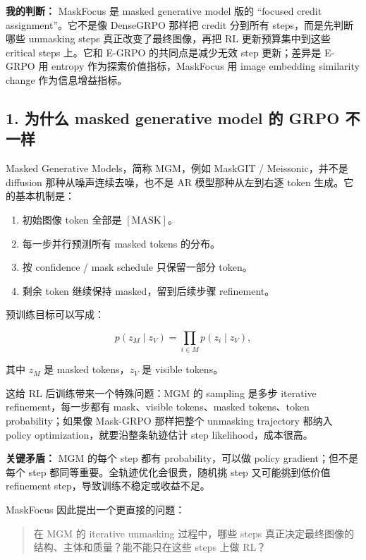 \begin{summarybox}
\textbf{我的判断：} MaskFocus 是 masked generative model 版的 ``focused credit assignment''。它不是像 DenseGRPO 那样把 credit 分到所有 steps，而是先判断哪些 unmasking steps 真正改变了最终图像，再把 RL 更新预算集中到这些 critical steps 上。它和 E-GRPO 的共同点是减少无效 step 更新；差异是 E-GRPO 用 entropy 作为探索价值指标，MaskFocus 用 image embedding similarity change 作为信息增益指标。
\end{summarybox}

\subsection{1. 为什么 masked generative model 的 GRPO 不一样}

Masked Generative Models，简称 MGM，例如 MaskGIT / Meissonic，并不是 diffusion 那种从噪声连续去噪，也不是 AR 模型那种从左到右逐 token 生成。它的基本机制是：

\begin{enumerate}[leftmargin=1.5em]
  \item 初始图像 token 全部是 \([\mathrm{MASK}]\)。
  \item 每一步并行预测所有 masked tokens 的分布。
  \item 按 confidence / mask schedule 只保留一部分 token。
  \item 剩余 token 继续保持 masked，留到后续步骤 refinement。
\end{enumerate}

预训练目标可以写成：

\[
p(z_M\mid z_V)
=
\prod_{i\in M}p(z_i\mid z_V),
\]

其中 \(z_M\) 是 masked tokens，\(z_V\) 是 visible tokens。

这给 RL 后训练带来一个特殊问题：MGM 的 sampling 是多步 iterative refinement，每一步都有 mask、visible tokens、masked tokens、token probability；如果像 Mask-GRPO 那样把整个 unmasking trajectory 都纳入 policy optimization，就要沿整条轨迹估计 step likelihood，成本很高。

\begin{warnbox}
\textbf{关键矛盾：} MGM 的每个 step 都有 probability，可以做 policy gradient；但不是每个 step 都同等重要。全轨迹优化会很贵，随机挑 step 又可能挑到低价值 refinement step，导致训练不稳定或收益不足。
\end{warnbox}

MaskFocus 因此提出一个更直接的问题：

\begin{quote}
在 MGM 的 iterative unmasking 过程中，哪些 steps 真正决定最终图像的结构、主体和质量？能不能只在这些 steps 上做 RL？
\end{quote}


